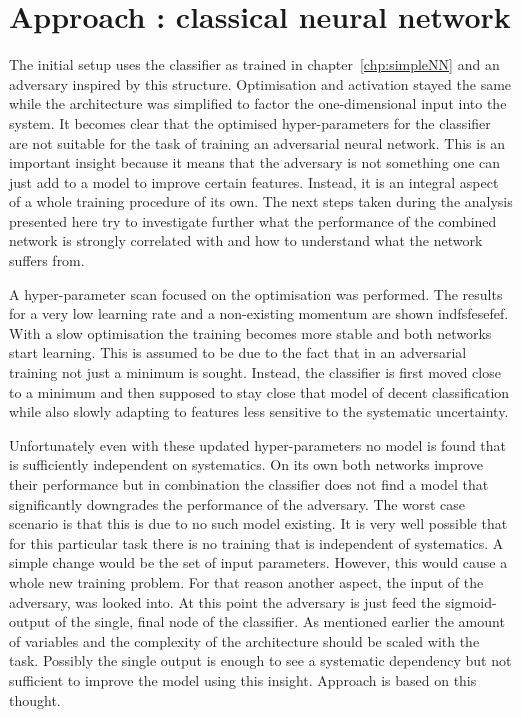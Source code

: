 


\section{Approach : classical neural network}

The initial setup uses the classifier as trained in chapter~\ref{chp:simpleNN} and an adversary inspired by this structure. Optimisation and activation stayed the same while the architecture was simplified to factor the one-dimensional input into the system.
It becomes clear that the optimised hyper-parameters for the classifier are not suitable for the task of training an adversarial neural network. This is an important insight because it means that the adversary is not something one can just add to a model to improve certain features. Instead, it is an integral aspect of a whole training procedure of its own. The next steps taken during the analysis presented here try to investigate further what the performance of the combined network is strongly correlated with and how to understand what the network suffers from.

A hyper-parameter scan focused on the optimisation was performed. The results for a very low learning rate and a non-existing momentum are shown indfsfesefef.
With a slow optimisation the training becomes more stable and both networks start learning. This is assumed to be due to the fact that in an adversarial training not just a minimum is sought. Instead, the classifier is first moved close to a minimum and then supposed to stay close that model of decent classification while also slowly adapting to features less sensitive to the systematic uncertainty.

Unfortunately even with these updated hyper-parameters no model is found that is sufficiently independent on systematics. On its own both networks improve their performance but in combination the classifier does not find a model that significantly downgrades the performance of the adversary.
The worst case scenario is that this is due to no such model existing. It is very well possible that for this particular task there is no training that is independent of systematics.
A simple change would be the set of input parameters. However, this would cause a whole new training problem. For that reason another aspect, the input of the adversary, was looked into. At this point the adversary is just feed the sigmoid-output of the single, final node of the classifier. As mentioned earlier the amount of variables and the complexity of the architecture should be scaled with the task. Possibly the single output is enough to see a systematic dependency but not sufficient to improve the model using this insight. Approach  is based on this thought.

